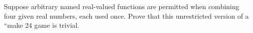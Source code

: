 Suppose arbitrary named real-valued functions are permitted when combining four given real numbers, each used once. Prove that this unrestricted version of a ``make 24 game is trivial.
